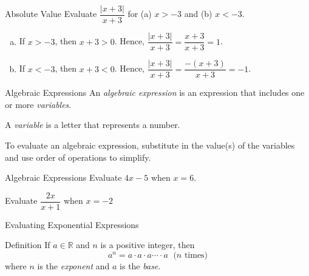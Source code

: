 \documentclass{beamer}
\def\R{\mathbb{R}} %
\newcommand{\fp}[1]{\left({#1}\right)} %
\newcommand{\av}[1]{\left|{#1}\right|} %
\begin{document}
\begin{frame}[t]{Absolute Value}
Evaluate $\dfrac{\av{x+3}}{x+3}$ for (a) $x > -3$ and (b) $x < -3$.

\begin{enumerate}[(a)]
\item<2-> If $x > -3$, then $x + 3 > 0$. Hence, $\dfrac{\av{x+3}}{x+3} = \dfrac{x+3}{x+3} = 1$.
\item<3> If $x < -3$, then $x + 3 < 0$. Hence, $\dfrac{\av{x+3}}{x+3} = \dfrac{-\fp{x+3}}{x+3} = -1$.
\end{enumerate}
\end{frame}

\begin{frame}[t]{Algebraic Expressions}
An \textit{algebraic expression} is an expression that includes one or more \textit{variables}.

A \textit{variable} is a letter that represents a number.

To evaluate an algebraic expression, substitute in the value(s) of the variables and use order of operations to simplify.
\end{frame}

\begin{frame}[t]{Algebraic Expressions}
Evaluate $4x - 5$ when $x = 6$. \vspace{-6pt}

Evaluate $\dfrac{2x}{x+1}$ when $x = -2$
\end{frame}

\begin{frame}[t]{Evaluating Exponential Expressions}
\begin{block}{Definition}
If $a \in \R$ and $n$ is a positive integer, then $$a^n = a\cdot a \cdot a \cdots \cdot a \; \text{ ($n$ times)}$$ where $n$ is the \textit{exponent} and $a$ is the \textit{base}.
\end{block}
\end{frame}
\end{document}

